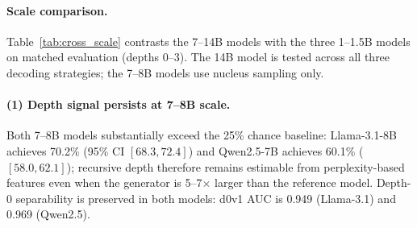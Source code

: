 \paragraph{Scale comparison.}
Table~\ref{tab:cross_scale} contrasts the 7--14B models with the three 1--1.5B models on matched evaluation (depths 0--3).
The 14B model is tested across all three decoding strategies; the 7--8B models use nucleus sampling only.

\begin{table}[h]
\centering
\small
\caption{Cross-scale comparison: 4-class RF accuracy (\%, depths 0--3), $\mathrm{EDD}_{0.70}$ (computed from full depth range: 0--5 for 1--1.5B nucleus and 7--8B, 0--3 for 1--1.5B temp/top-$k$ and 14B), and d0-vs-d1 AUC. CI: 95\% bootstrap. Chance = 25\%. $^\dagger$Self-reference model (see text).}
\label{tab:cross_scale}
\end{table}

\paragraph{(1) Depth signal persists at 7--8B scale.}
Both 7--8B models substantially exceed the 25\% chance baseline: Llama-3.1-8B achieves 70.2\% (95\% CI $[68.3, 72.4]$) and Qwen2.5-7B achieves 60.1\% ($[58.0, 62.1]$); recursive depth therefore remains estimable from perplexity-based features even when the generator is 5--7$\times$ larger than the reference model.
Depth-0 separability is preserved in both models: d0v1 AUC is 0.949 (Llama-3.1) and 0.969 (Qwen2.5).

